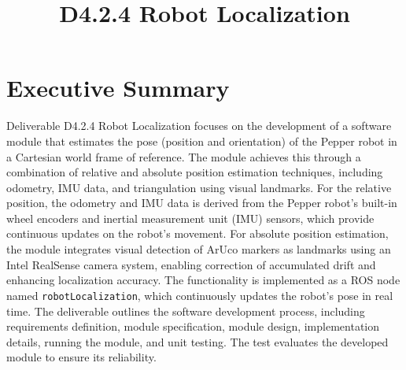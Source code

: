 \documentclass{CSSRforAfrica}
\begin{document}



\title{D4.2.4 Robot Localization}        %





\maketitle

\section*{Executive Summary}
\label{executive_summary}

Deliverable D4.2.4 Robot Localization focuses on the development of a software module that estimates the pose (position and orientation) of the Pepper robot in a Cartesian world frame of reference. The module achieves this through a combination of relative and absolute position estimation techniques, including odometry, IMU data, and triangulation using visual landmarks. For the relative position, the odometry and IMU data is derived from the Pepper robot's built-in wheel encoders and inertial measurement unit (IMU) sensors, which provide continuous updates on the robot's movement. For absolute position estimation, the module integrates visual detection of ArUco markers as landmarks using an Intel RealSense camera system, enabling correction of accumulated drift and enhancing localization accuracy. The functionality is implemented as a ROS node named \texttt{robotLocalization}, which continuously updates the robot’s pose in real time. The deliverable outlines the software development process, including requirements definition, module specification, module design, implementation details, running the module, and unit testing. The test evaluates the developed module to ensure its reliability.
\end{document}
